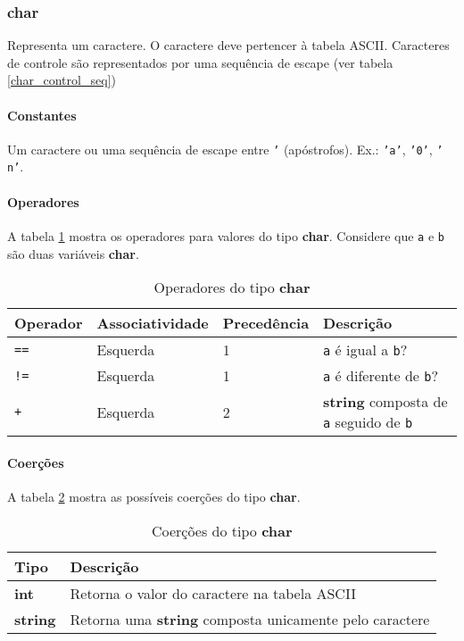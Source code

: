 \subsubsection{char}
Representa um caractere. O caractere deve pertencer à tabela ASCII. Caracteres de controle são representados por uma sequência de escape (ver tabela \ref{char_control_seq})

\paragraph{Constantes} Um caractere ou uma sequência de escape entre \texttt{'} (apóstrofos). Ex.: \texttt{'a'}, \texttt{'0'}, \texttt{'\\n'}.

\paragraph{Operadores}  A tabela \ref{tab:operadores-char} mostra os operadores para valores do tipo \textbf{char}. Considere que \texttt{a} e \texttt{b} são duas variáveis \textbf{char}.
\begin{table}[!h]
    \begin{tabular}{@{}llll@{}}
        \toprule
        Operador    & Associatividade & Precedência & Descrição                                                    \\ \midrule
        \texttt{==} & Esquerda        & 1           & \texttt{a} é igual a \texttt{b}?                             \\
        \texttt{!=} & Esquerda        & 1           & \texttt{a} é diferente de \texttt{b}?                        \\
        \texttt{+}  & Esquerda        & 2           & \textbf{string} composta de \texttt{a} seguido de \texttt{b}
    \end{tabular}
    \caption{Operadores do tipo \textbf{char}}
    \label{tab:operadores-char}
\end{table}

\paragraph{Coerções} A tabela \ref{tab:coercoes-char} mostra as possíveis coerções do tipo \textbf{char}.
\begin{table}[!h]
    \begin{tabular}{@{}ll@{}}
        \toprule
        Tipo            & Descrição                                                      \\ \midrule
        \textbf{int}    & Retorna o valor do caractere na tabela ASCII                   \\
        \textbf{string} & Retorna uma \textbf{string} composta unicamente pelo caractere \\ \bottomrule
    \end{tabular}
    \caption{Coerções do tipo \textbf{char}}
    \label{tab:coercoes-char}
\end{table}

